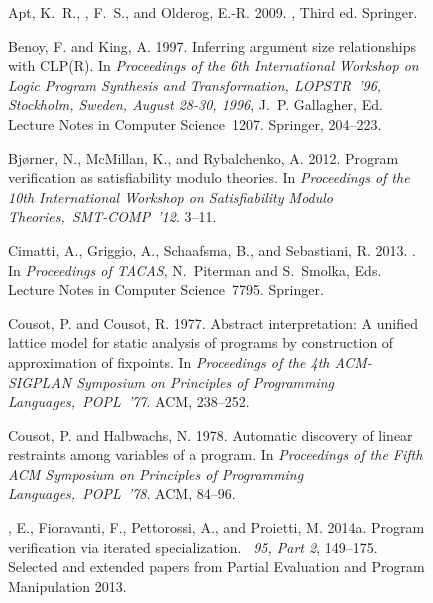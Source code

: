 \documentclass[english]{tlp}
\begin{document}
\begin{figure}[ht]
\begin{flushleft}
\begin{minipage}{124mm}
\begin{thebibliography}{}
{\sc Apt, K.~R.}, {, F.~S.}, {\sc and} {\sc Olderog, E.-R.} 2009.
, {T}hird
  ed.
\newblock Springer.

{\sc Benoy, F.} {\sc and} {\sc King, A.} 1997.
\newblock Inferring argument size relationships with {CLP(R)}.
\newblock In {\em Proceedings of the 6th International Workshop on Logic
  Program Synthesis and Transformation, LOPSTR~'96, Stockholm, Sweden, August
  28-30, 1996}, {J.~P. Gallagher}, Ed. Lecture Notes in Computer Science~1207.
  Springer, 204--223.

{\sc Bj{\o}rner, N.}, {\sc McMillan, K.}, {\sc and} {\sc Rybalchenko, A.} 2012.
\newblock Program verification as satisfiability modulo theories.
\newblock In {\em Proceedings of the 10th International Workshop on
  Satisfiability Modulo Theories,~SMT-COMP~'12}. 3--11.

{\sc Cimatti, A.}, {\sc Griggio, A.}, {\sc Schaafsma, B.}, {\sc and} {\sc
  Sebastiani, R.} 2013.
.
\newblock In {\em Proceedings of TACAS}, {N.~Piterman} {and} {S.~Smolka}, Eds.
  Lecture Notes in Computer Science~7795. Springer.

{\sc Cousot, P.} {\sc and} {\sc Cousot, R.} 1977.
\newblock Abstract interpretation: {A} unified lattice model for static
  analysis of pro\-grams by construction of approximation of fixpoints.
\newblock In {\em Proceedings of the 4th {ACM-SIGPLAN} Symposium on Principles
  of Pro\-gramming Languages,~POPL~'77}. {ACM}, 238--252.

{\sc Cousot, P.} {\sc and} {\sc Halbwachs, N.} 1978.
\newblock Automatic discovery of linear restraints among variables of a
  program.
\newblock In {\em Proceedings of the Fifth ACM Symposium on Principles of
  Programming Languages,~POPL~'78}. {ACM}, 84--96.

{, E.}, {\sc Fioravanti, F.}, {\sc Pettorossi, A.}, {\sc and}
  {\sc Proietti, M.} 2014a.
\newblock Program verification via iterated specialization.
~{\em 95, Part 2}, 149--175.
\newblock Selected and extended papers from Partial Evaluation and Program
  Manipulation 2013.


\end{thebibliography}
\end{minipage}
\end{flushleft}
\end{figure}
\end{document}
